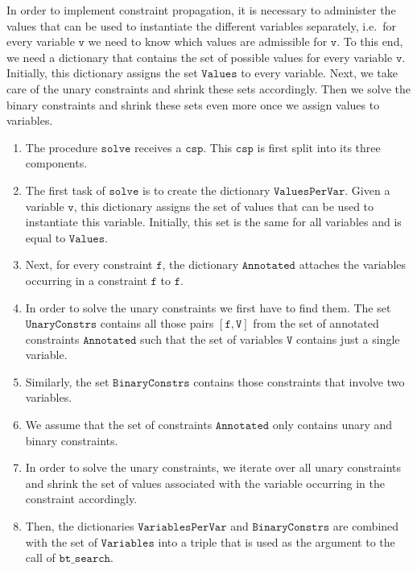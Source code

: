 In order to implement constraint propagation, it is necessary to administer the values that can be used
to instantiate the different variables separately, i.e.~for every variable $\mathtt{v}$ we need to know which
values are admissible for $\mathtt{v}$.  To this end, we need a dictionary that contains the set of possible
values for every variable $\mathtt{v}$.  Initially, this dictionary assigns the set $\mathtt{Values}$ to
every variable.  Next, we take care of the unary constraints and shrink these sets accordingly.  Then we solve
the binary constraints and shrink these sets even more once we assign values to variables.
\begin{enumerate}
\item The procedure $\mathtt{solve}$ receives a $\mathtt{csp}$.  This $\mathtt{csp}$ is first split into its three components.
\item The first task of $\mathtt{solve}$ is to create the dictionary $\mathtt{ValuesPerVar}$.  
      Given a variable $\mathtt{v}$, this dictionary assigns the set of values that can be used to instantiate this
      variable.  Initially, this set is the same for all variables and is equal to $\mathtt{Values}$.
\item Next, for every constraint $\mathtt{f}$, the dictionary $\mathtt{Annotated}$ attaches the
      variables occurring in a constraint $\mathtt{f}$ to $\mathtt{f}$.
\item In order to solve the unary constraints we first have to find them.
      The set $\mathtt{UnaryConstrs}$ contains all those pairs $[\mathtt{f}, \mathtt{V}]$ from the set of
      annotated constraints $\mathtt{Annotated}$ such that the set of variables $\mathtt{V}$ contains just a
      single variable. 
\item Similarly, the set $\mathtt{BinaryConstrs}$ contains those constraints that involve two variables.
\item We assume that the set of constraints $\mathtt{Annotated}$ only contains unary and binary constraints.
\item In order to solve the unary constraints, we iterate over all unary constraints and shrink the set of
      values associated with the variable occurring in the constraint accordingly.
\item Then, the dictionaries $\mathtt{VariablesPerVar}$ and $\mathtt{BinaryConstrs}$ are combined with the set
      of $\mathtt{Variables}$ into a triple that is used as the argument to the call of $\mathtt{bt\_search}$.
\end{enumerate}

